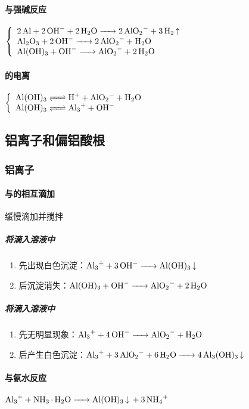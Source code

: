 \documentclass[a4paper]{article}
\begin{document}
	\paragraph{与强碱反应}
	$\left\{\begin{array}{lr}
		\ce{2Al + 2OH- + 2H2O -> 2AlO2- + 3H2 ^}\\
		\ce{Al2O3 + 2OH- -> 2AlO2- + H2O}\\
		\ce{Al(OH)3 + OH- -> AlO2- + 2H2O}\\
	\end{array}\right.$
	\paragraph{的电离}
	$\left\{\begin{array}{lr}
		\ce{Al(OH)3 <=> H+ + AlO2- + H2O}\\
		\ce{Al(OH)3 <=> Al3+ + OH-}\\
	\end{array}\right.$
	
	\subsection{铝离子和偏铝酸根}
	\subsubsection{铝离子}
	\paragraph{与的相互滴加}
	缓慢滴加并搅拌
	\subparagraph{将滴入溶液中}
	\begin{enumerate}
		\item 先出现白色沉淀：$\ce{Al3+ + 3OH- -> Al(OH)3 v}\\$
		\item 后沉淀消失：$\ce{Al(OH)3 + OH- -> AlO2- + 2H2O}\\$
	\end{enumerate}
	\subparagraph{将滴入溶液中}
	\begin{enumerate}
		\item 先无明显现象：$\ce{Al3+ + 4OH- -> AlO2- + H2O}\\$
		\item 后产生白色沉淀：$\ce{Al3+ + 3AlO2- + 6H2O -> 4Al3(OH)3 v}\\$
	\end{enumerate}
	\paragraph{与氨水反应}
	$\ce{Al3+ + NH3*H2O -> Al(OH)3 v + 3NH4+}\\$
\end{document}

